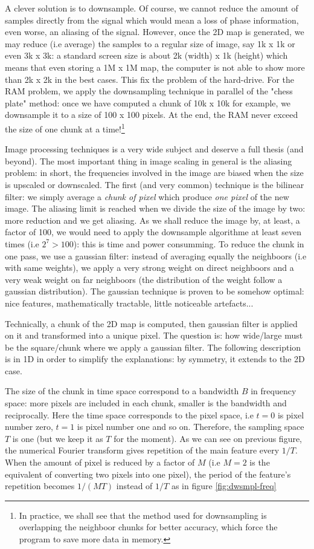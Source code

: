 \documentclass[10pt]{report}
\begin{document}
A clever solution is to downsample. Of course, we cannot reduce the amount of samples directly from the signal which would mean a loss of phase information, even worse, an aliasing of the signal. However, once the 2D map is generated, we may reduce (i.e average) the samples to a regular size of image, say 1k x 1k or even 3k x 3k: a standard screen size is about 2k (width) x 1k (height) which means that even storing a 1M x 1M map, the computer is not able to show more than 2k x 2k in the best cases. This fix the problem of the hard-drive. For the RAM problem, we apply the downsampling technique in parallel of the "chess plate" method: once we have computed a chunk of 10k x 10k for example, we downsample it to a size of 100 x 100 pixels. At the end, the RAM never exceed the size of one chunk at a time!\footnote{In practice, we shall see that the method used for downsampling is overlapping the neighboor chunks for better accuracy, which force the program to save more data in memory.}

Image processing techniques is a very wide subject and deserve a full thesis (and beyond). The most important thing in image scaling in general is the aliasing problem: in short, the frequencies involved in the image are biased when the size is upscaled or downscaled. The first (and very common) technique is the bilinear filter: we simply average a \textit{chunk of pixel} which produce \textit{one pixel} of the new image. The aliasing limit is reached when we divide the size of the image by two: more reduction and we get aliasing. As we shall reduce the image by, at least, a factor of 100, we would need to apply the downsample algorithme at least seven times (i.e $2^7 > 100$): this is time and power consumming. To reduce the chunk in one pass, we use a gaussian filter: instead of averaging equally the neighboors (i.e with same weights), we apply a very strong weight on direct neighboors and a very weak weight on far neighboors (the distribution of the weight follow a gaussian distribution). The gaussian technique is proven to be somehow optimal: nice features, mathematically tractable, little noticeable artefacts...

Technically, a chunk of the 2D map is computed, then gaussian filter is applied on it and transformed into a unique pixel. The question is: how wide/large must be the square/chunk where we apply a gaussian filter. The following description is in 1D in order to simplify the explanations: by symmetry, it extends to the 2D case.

The size of the chunk in time space correspond to a bandwidth $B$ in frequency space: more pixels are included in each chunk, smaller is the bandwidth and reciprocally. Here the time space corresponds to the pixel space, i.e $t=0$ is pixel number zero, $t=1$ is pixel number one and so on. Therefore, the sampling space $T$ is one (but we keep it as $T$ for the moment). As we can see on previous figure, the numerical Fourier transform gives repetition of the main feature every $1/T$. When the amount of pixel is reduced by a factor of $M$ (i.e $M=2$ is the equivalent of converting two pixels into one pixel), the period of the feature's repetition becomes $1/(MT)$ instead of $1/T$ as in figure \ref{fig:dwsmpl-freq}
\end{document}
